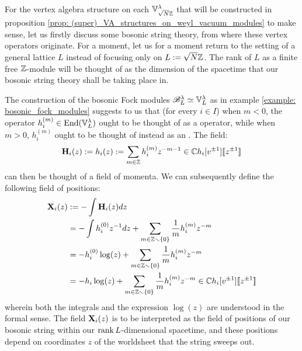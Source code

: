             For the vertex algebra structure on each $\mathbb{V}_{\sqrt{N} \mathbb{Z}}^{\lambda}$ that will be constructed in proposition \ref{prop: (super)_VA_structures_on_weyl_vacuum_modules} to make sense, let us firstly discuss some bosonic string theory, from where these vertex operators originate. For a moment, let us for a moment return to the setting of a general lattice $L$ instead of focusing only on $L := \sqrt{N} \mathbb{Z}$. The rank of $L$ as a finite free $\mathbb{Z}$-module will be thought of as the dimension of the spacetime that our bosonic string theory shall be taking place in. 

            The construction of the bosonic Fock modules $\mathscr{B}_L^{\lambda} \simeq \mathbb{V}_L^{\lambda}$ as in example \ref{example: bosonic_fock_modules} suggests to us that (for every $i \in I$) when $m < 0$, the operator $h_i^{(m)} \in \mathrm{End}(\mathbb{V}_L^{\lambda})$ ought to be thought of as a  operator, while when $m > 0$, $h_i^{(m)}$ ought to be thought of instead as an . The field:
                $$\mathbf{H}_i(z) := h_i(z) := \sum_{m \in \mathbb{Z}} h_i^{(m)} z^{-m - 1} \in \mathbb{C} h_i[v^{\pm 1}][\![z^{\pm 1}]\!]$$
            can then be thought of a field of momenta. We can subsequently define the following field of positions:
                $$
                    \begin{aligned}
                        \mathbf{X}_i(z) & := -\int \mathbf{H}_i(z) dz
                        \\
                        & = -\int h_i^{(0)} z^{-1} dz + \sum_{m \in \mathbb{Z} \smallsetminus \{0\}} \frac1m h_i^{(m)} z^{-m}
                        \\
                        & = -h_i^{(0)} \log(z) + \sum_{m \in \mathbb{Z} \smallsetminus \{0\}} \frac1m h_i^{(m)} z^{-m}
                        \\
                        & = -h_i \log(z) + \sum_{m \in \mathbb{Z} \smallsetminus \{0\}} \frac1m h_i^{(m)} z^{-m} \in \mathbb{C} h_i[v^{\pm 1}][\![z^{\pm 1}]\!]
                    \end{aligned}
                $$
            wherein both the integrals and the expression $\log(z)$ are understood in the formal sense. The field $\mathbf{X}_i(z)$ is to be interpreted as the field of positions of our bosonic string within our $\operatorname{rank} L$-dimensional spacetime, and these positions depend on coordinates $z$ of the worldsheet that the string sweeps out.
            
